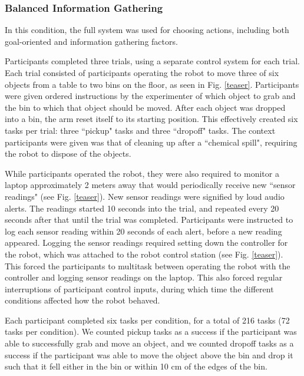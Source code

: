 \documentclass[conference]{IEEEtran}
\begin{document}
\subsubsection{Balanced Information Gathering}
In this condition, the full system was used for choosing actions, including both goal-oriented and information gathering factors.

Participants completed three trials, using a separate control system for each trial. Each trial consisted of participants operating the robot to move three of six objects from a table to two bins on the floor, as seen in Fig. \ref{teaser}. Participants were given ordered instructions by the experimenter of which object to grab and the bin to which that object should be moved. After each object was dropped into a bin, the arm reset itself to its starting position. This effectively created six tasks per trial: three ``pickup" tasks and three ``dropoff" tasks. The context participants were given was that of cleaning up after a ``chemical spill", requiring the robot to dispose of the objects.

While participants operated the robot, they were also required to monitor a laptop approximately 2 meters away that would periodically receive new ``sensor readings" (see Fig. \ref{teaser}). New sensor readings were signified by loud audio alerts. The readings started 10 seconds into the trial, and repeated every 20 seconds after that until the trial was completed. Participants were instructed to log each sensor reading within 20 seconds of each alert, before a new reading appeared. Logging the sensor readings required setting down the controller for the robot, which was attached to the robot control station (see Fig. \ref{teaser}). This forced the participants to multitask between operating the robot with the controller and logging sensor readings on the laptop. This also forced regular interruptions of participant control inputs, during which time the different conditions affected how the robot behaved. 

Each participant completed six tasks per condition, for a total of 216 tasks (72 tasks per condition). We counted pickup tasks as a success if the participant was able to successfully grab and move an object, and we counted dropoff tasks as a success if the participant was able to move the object above the bin and drop it such that it fell either in the bin or within 10 cm of the edges of the bin.
\end{document}
